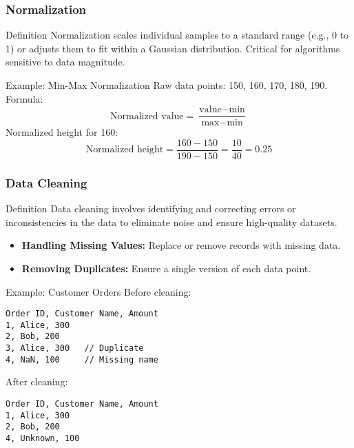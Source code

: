 \documentclass[aspectratio=169]{beamer}
\begin{document}
\begin{frame}[fragile]
    \frametitle{Normalization}
    \begin{block}{Definition}
        Normalization scales individual samples to a standard range (e.g., 0 to 1) or adjusts them to fit within a Gaussian distribution. Critical for algorithms sensitive to data magnitude.
    \end{block}

    \begin{exampleblock}{Example: Min-Max Normalization}
        Raw data points: 150, 160, 170, 180, 190.\\
        Formula: 
        \begin{equation}
            \text{Normalized value} = \frac{\text{value} - \text{min}}{\text{max} - \text{min}}
        \end{equation}
        Normalized height for 160:
        \begin{equation}
            \text{Normalized height} = \frac{160 - 150}{190 - 150} = \frac{10}{40} = 0.25
        \end{equation}
    \end{exampleblock}
\end{frame}

\begin{frame}[fragile]
    \frametitle{Data Cleaning}
    \begin{block}{Definition}
        Data cleaning involves identifying and correcting errors or inconsistencies in the data to eliminate noise and ensure high-quality datasets.
    \end{block}

    \begin{itemize}
        \item \textbf{Handling Missing Values:} Replace or remove records with missing data.
        \item \textbf{Removing Duplicates:} Ensure a single version of each data point.
    \end{itemize}

    \begin{exampleblock}{Example: Customer Orders}
        Before cleaning:
        \begin{verbatim}
Order ID, Customer Name, Amount
1, Alice, 300
2, Bob, 200
3, Alice, 300   // Duplicate
4, NaN, 100     // Missing name
        \end{verbatim}
        After cleaning:
        \begin{verbatim}
Order ID, Customer Name, Amount
1, Alice, 300
2, Bob, 200
4, Unknown, 100
        \end{verbatim}
    \end{exampleblock}
\end{frame}
\end{document}

